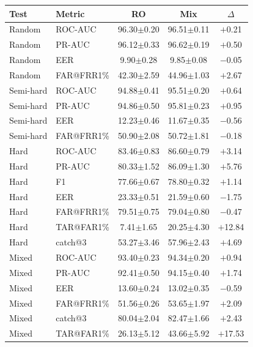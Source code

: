\documentclass[11pt]{article}
\begin{document}
\begin{table}[!t]
\begin{minipage}[t]{0.48\textwidth}
\begin{tabular}{l l c c c}
\bottomrule
\end{tabular}
\label{tab:app_sbert_pan_bert}
\end{minipage}%
\hfill
\begin{minipage}[t]{0.48\textwidth}
\centering
\begin{tabular}{l l c c c}
\toprule
\textbf{Test} & \textbf{Metric} & \textbf{RO} & \textbf{Mix} & \textbf{$\Delta$} \\
\midrule
Random    & ROC-AUC    & 96.30$\pm$0.20 & 96.51$\pm$0.11 & $+$0.21 \\
Random    & PR-AUC     & 96.12$\pm$0.33 & 96.62$\pm$0.19 & $+$0.50 \\
Random    & EER        & \phantom{0}9.90$\pm$0.28 & \phantom{0}9.85$\pm$0.08 & $-$0.05 \\
Random    & FAR@FRR1\% & 42.30$\pm$2.59 & 44.96$\pm$1.03 & $+$2.67 \\
\midrule
Semi-hard & ROC-AUC    & 94.88$\pm$0.41 & 95.51$\pm$0.20 & $+$0.64 \\
Semi-hard & PR-AUC     & 94.86$\pm$0.50 & 95.81$\pm$0.23 & $+$0.95 \\
Semi-hard & EER        & 12.23$\pm$0.46 & 11.67$\pm$0.35 & $-$0.56 \\
Semi-hard & FAR@FRR1\% & 50.90$\pm$2.08 & 50.72$\pm$1.81 & $-$0.18 \\
\midrule
Hard      & ROC-AUC    & 83.46$\pm$0.83 & 86.60$\pm$0.79 & $+$3.14 \\
Hard      & PR-AUC     & 80.33$\pm$1.52 & 86.09$\pm$1.30 & $+$5.76 \\
Hard      & F1         & 77.66$\pm$0.67 & 78.80$\pm$0.32 & $+$1.14 \\
Hard      & EER        & 23.33$\pm$0.51 & 21.59$\pm$0.60 & $-$1.75 \\
Hard      & FAR@FRR1\% & 79.51$\pm$0.75 & 79.04$\pm$0.80 & $-$0.47 \\
Hard      & TAR@FAR1\% & \phantom{0}7.41$\pm$1.65 & 20.25$\pm$4.30 & $+$12.84 \\
Hard      & catch@3    & 53.27$\pm$3.46 & 57.96$\pm$2.43 & $+$4.69 \\
\midrule
Mixed     & ROC-AUC    & 93.40$\pm$0.23 & 94.34$\pm$0.20 & $+$0.94 \\
Mixed     & PR-AUC     & 92.41$\pm$0.50 & 94.15$\pm$0.40 & $+$1.74 \\
Mixed     & EER        & 13.60$\pm$0.24 & 13.02$\pm$0.35 & $-$0.59 \\
Mixed     & FAR@FRR1\% & 51.56$\pm$0.26 & 53.65$\pm$1.97 & $+$2.09 \\
Mixed     & catch@3    & 80.04$\pm$2.04 & 82.47$\pm$1.66 & $+$2.43 \\
Mixed     & TAR@FAR1\% & 26.13$\pm$5.12 & 43.66$\pm$5.92 & $+$17.53 \\
\bottomrule
\end{tabular}
\label{tab:app_sbert_wc_distilbert}


\end{minipage}
\end{table}
\end{document}
